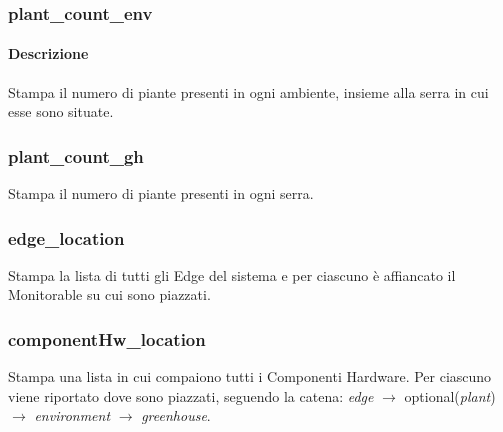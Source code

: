 \subsubsection{plant\_count\_env}
\paragraph{Descrizione}
Stampa il numero di piante presenti in ogni ambiente, insieme alla serra in cui esse sono situate.

\subsubsection{plant\_count\_gh}
Stampa il numero di piante presenti in ogni serra.

\subsubsection{edge\_location}
Stampa la lista di tutti gli Edge del sistema e per ciascuno è affiancato il Monitorable su cui sono piazzati.

\subsubsection{componentHw\_location}
Stampa una lista in cui compaiono tutti i Componenti Hardware. Per ciascuno viene riportato dove sono piazzati, seguendo la catena: \textit{edge} $\rightarrow$ optional(\textit{plant}) $\rightarrow$ \textit{environment} $\rightarrow$ \textit{greenhouse}.
